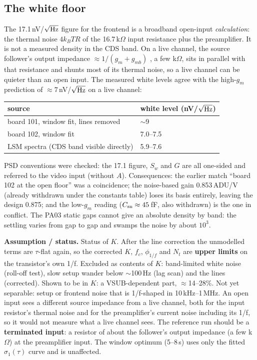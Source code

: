 \documentclass[10pt,a4paper]{article}
\newcommand{\caveat}[1]{\par\smallskip\noindent\colorbox{orange!10}{\parbox{\dimexpr\linewidth-2\fboxsep}{\small\textbf{Assumption / status.} #1}}\par\smallskip}
\begin{document}
\subsection{The white floor}\label{sec:floor}
The 17.1\,nV/$\sqrt{\rm Hz}$ figure for the frontend is a broadband open-input \emph{calculation}: the thermal noise
$4k_BTR$ \cite{johnson1928,nyquist1928} of the 16.7\,k$\Omega$ input resistance plus the preamplifier. It is not a
measured density in the CDS band. On a live channel, the source follower's output impedance
$\approx1/(g_m+g_{mb})$ \cite{gray2009}, a few k$\Omega$, sits in parallel with that resistance and shunts most of its
thermal noise, so a live channel can be quieter than an open input. The measured white levels agree with the
high-$g_m$ prediction of $\approx7$\,nV/$\sqrt{\rm Hz}$ on a live channel:
\begin{center}\small
\begin{tabular}{@{}ll@{}}\toprule
source & white level (nV/$\sqrt{\rm Hz}$)\\\midrule
board 101, window fit, lines removed & $\sim$9\\
board 102, window fit & 7.0--7.5\\
LSM spectra (CDS band visible directly) & 5.9--7.6\\\bottomrule
\end{tabular}
\end{center}
PSD conventions were checked: the 17.1 figure, $S_w$ and $G$ are all one-sided and referred to the video input
(without $A$). Consequences: the earlier match ``board 102 at the open floor'' was a coincidence; the noise-based gain
0.853\,ADU/\textmu V (already withdrawn under the constants table) loses its basis entirely, leaving the design 0.875; and the
low-$g_m$ reading ($C_{\rm sn}\approx45$\,fF, also withdrawn) is the one in conflict. The PA03 static gaps cannot give
an absolute density by band: the settling varies from gap to gap and swamps the noise by about $10^3$.

\caveat{Status of $K$. After the line correction the unmodelled terms are $\tau$-flat again, so the corrected $K$,
$f_c$, $\phi_{1/f}$ and $N_t$ are \textbf{upper limits} on the transistor's own 1/f. Excluded as contents of $K$:
band-limited white noise (roll-off test), slow setup wander below $\sim$100\,Hz (lag scan) and the lines (corrected).
Shown to be in $K$: a VSUB-dependent part, $\approx$14--28\%. Not yet separable: setup or frontend noise that is
1/f-shaped in 10\,kHz--1\,MHz. An open input sees a different source impedance from a live channel, both for the input
resistor's thermal noise and for the preamplifier's current noise including its 1/f, so it would not measure what a
live channel sees. The reference run should be a \textbf{terminated input}: a resistor of about the follower's output
impedance (a few k$\Omega$) at the preamplifier input. The window optimum (5--8\,\textmu s) uses only the fitted
$\sigma_1(\tau)$ curve and is unaffected.}
\end{document}
